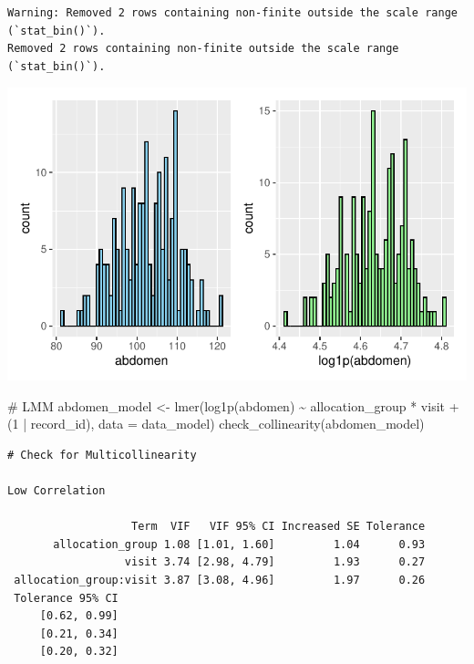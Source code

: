 \documentclass[
  letterpaper,
  DIV=11,
  numbers=noendperiod]{scrartcl}
\newenvironment{Shaded}{\begin{snugshade}}{\end{snugshade}}
\newcommand{\AttributeTok}[1]{\textcolor[rgb]{0.40,0.45,0.13}{#1}}
\newcommand{\CommentTok}[1]{\textcolor[rgb]{0.37,0.37,0.37}{#1}}
\newcommand{\DecValTok}[1]{\textcolor[rgb]{0.68,0.00,0.00}{#1}}
\newcommand{\FunctionTok}[1]{\textcolor[rgb]{0.28,0.35,0.67}{#1}}
\newcommand{\NormalTok}[1]{\textcolor[rgb]{0.00,0.23,0.31}{#1}}
\newcommand{\OtherTok}[1]{\textcolor[rgb]{0.00,0.23,0.31}{#1}}
\newcommand{\SpecialCharTok}[1]{\textcolor[rgb]{0.37,0.37,0.37}{#1}}
\begin{document}
\begin{verbatim}
Warning: Removed 2 rows containing non-finite outside the scale range (`stat_bin()`).
Removed 2 rows containing non-finite outside the scale range (`stat_bin()`).
\end{verbatim}

\includegraphics{Outcomes_V1V2V3_files/figure-pdf/abdomen_1-1.pdf}

\begin{Shaded}
\begin{Highlighting}[]
\CommentTok{\# LMM}
\NormalTok{abdomen\_model }\OtherTok{\textless{}{-}} \FunctionTok{lmer}\NormalTok{(}\FunctionTok{log1p}\NormalTok{(abdomen) }\SpecialCharTok{\textasciitilde{}}\NormalTok{ allocation\_group }\SpecialCharTok{*}\NormalTok{ visit }\SpecialCharTok{+}\NormalTok{ (}\DecValTok{1} \SpecialCharTok{|}\NormalTok{ record\_id), }\AttributeTok{data =}\NormalTok{ data\_model)}
\FunctionTok{check\_collinearity}\NormalTok{(abdomen\_model)}
\end{Highlighting}
\end{Shaded}

\begin{verbatim}
# Check for Multicollinearity

Low Correlation

                   Term  VIF   VIF 95% CI Increased SE Tolerance
       allocation_group 1.08 [1.01, 1.60]         1.04      0.93
                  visit 3.74 [2.98, 4.79]         1.93      0.27
 allocation_group:visit 3.87 [3.08, 4.96]         1.97      0.26
 Tolerance 95% CI
     [0.62, 0.99]
     [0.21, 0.34]
     [0.20, 0.32]
\end{verbatim}
\end{document}
